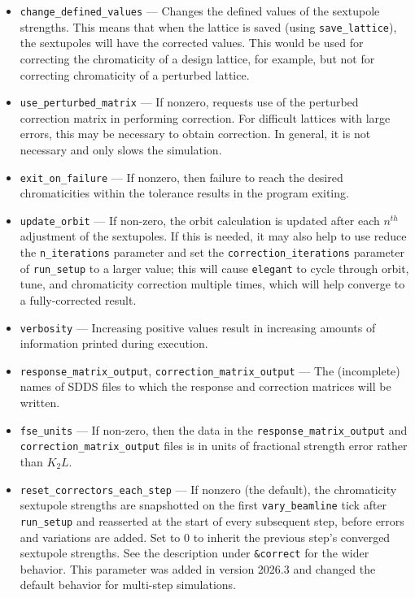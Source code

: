 \documentclass[11pt]{article}
\begin{document}
\begin{itemize}
be written.  Recommended value: ``\%s.ssl''. May be used with \verb|load_parameters|.
\item \verb|change_defined_values| --- Changes the defined values of the sextupole strengths.
This means that when the lattice is saved (using \verb|save_lattice|), the sextupoles will
have the corrected values.  This would be used for correcting the chromaticity of a design
lattice, for example, but not for correcting chromaticity of a perturbed lattice.
\item \verb|use_perturbed_matrix| --- If nonzero, requests use of the perturbed correction matrix in
performing correction.  For difficult lattices with large errors, this may be necessary
to obtain correction.  In general, it is not necessary and only slows the simulation.
\item \verb|exit_on_failure| --- If nonzero, then failure to reach the desired chromaticities within the
  tolerance results in the program exiting.
\item \verb|update_orbit| --- If non-zero, the orbit calculation is updated after each $n^{th}$ adjustment of the
  sextupoles. If this is needed, it may also help to use reduce the \verb|n_iterations| parameter and 
  set the \verb|correction_iterations| parameter of \verb|run_setup| to a larger value; this will cause
  \verb|elegant| to cycle through orbit, tune, and chromaticity correction multiple times, which will
  help converge to a fully-corrected result.
\item \verb|verbosity| --- Increasing positive values result in increasing amounts of information printed during
  execution.
\item \verb|response_matrix_output|, \verb|correction_matrix_output| --- The (incomplete) names of SDDS files
  to which the response and correction matrices will be written.
\item \verb|fse_units| --- If non-zero, then the data in the  \verb|response_matrix_output| and \verb|correction_matrix_output|
  files is in units of fractional strength error rather than $K_2L$.
\item \verb|reset_correctors_each_step| --- If nonzero (the default), the chromaticity
  sextupole strengths are snapshotted on the first \verb|vary_beamline| tick after
  \verb|run_setup| and reasserted at the start of every subsequent step, before
  errors and variations are added.  Set to 0 to inherit the previous step's converged
  sextupole strengths.  See the description under \verb|&correct| for the wider behavior.
This parameter was added in version 2026.3 and changed the default behavior for multi-step simulations.
\end{itemize}
\end{document}
